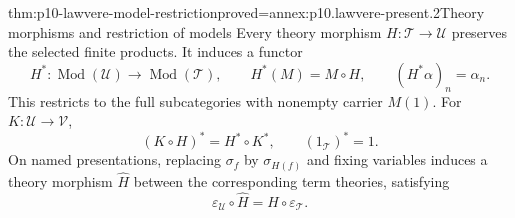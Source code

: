\begin{hbtheorem}{thm:p10-lawvere-model-restriction}{proved=annex:p10.lawvere-present.2}{Theory morphisms and restriction of models}
Every theory morphism \(H:\mathcal T\to\mathcal U\) preserves
the selected finite products.  It induces a functor
\[
 H^*:\operatorname{Mod}(\mathcal U)\longrightarrow
                         \operatorname{Mod}(\mathcal T),
 \qquad H^*(M)=M\circ H,\qquad
              (H^*\alpha)_n=\alpha_n.
\]
This restricts to the full subcategories with nonempty carrier
\(M(1)\).  For \(K:\mathcal U\to\mathcal V\),
\[
             (K\circ H)^*=H^*\circ K^*,\qquad (1_{\mathcal T})^*=1.
\]
On named presentations, replacing \(\sigma_f\) by \(\sigma_{H(f)}\)
and fixing variables induces a theory morphism \(\widehat H\)
between the corresponding term theories, satisfying
\[
       \varepsilon_{\mathcal U}\circ\widehat H
                        =H\circ\varepsilon_{\mathcal T}.
\]
\end{hbtheorem}
